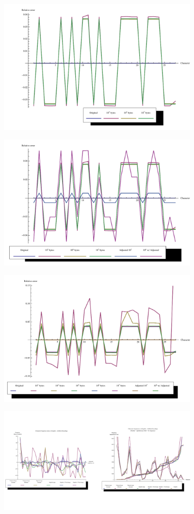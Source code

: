 \documentclass[12pt]{report}
\theoremstyle{remark}
\theoremstyle{definition}
\theoremstyle{definition}
\theoremstyle{definition}
\begin{document}
\begin{figure}
\centering
\includegraphics[width=4in]{figures/pdf_convergence.pdf}
\end{figure}
\clearpage
\begin{figure}
\centering
\includegraphics[width=4in]{figures/pdf_convergence_adjusted.pdf}
\end{figure}
\begin{figure}
\centering
\includegraphics[width=4in]{figures/pdf_convergence_adjusted2.pdf}
\end{figure}
\begin{figure}
\centering
\includegraphics[width=4in]{figures/plots_best.pdf}
\end{figure}
\end{document}
